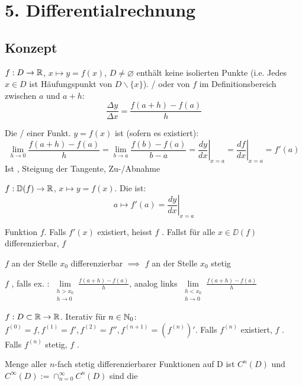 \section{5. Differentialrechnung}

\subsection{Konzept}

\Def $f: D \to \mathbb{R}$, $x \mapsto y = f(x)$, $D \neq \varnothing$ enthält keine
isolierten Punkte (i.e. Jedes $x \in D$ ist Häufungspunkt von $D \backslash \{x\}$).
/ oder 
von $f$ im Definitionsbereich zwischen $a$ und $a+h$:
$$\frac{\Delta y}{\Delta x} = \frac{f(a+h) - f(a)}{h}$$

\Def Die / einer Funkt. $y = f(x)$ 
ist (sofern es existiert):
$$\lim\limits_{h\to 0} \frac{f(a+h)-f(a)}{h} = \lim\limits_{b\to a}\frac{f(b) - f(a)}{b - a} = \left.\frac{dy}{dx}\right|_{x=a} = \left.\frac{df}{dx}\right|_{x=a} = f'(a)$$
Ist , Steigung der Tangente,  Zu-/Abnahme

\Def $f: \mathbb{D}(f) \to \mathbb{R}$, $x \mapsto y = f(x)$. Die  ist:
$$a \mapsto f'(a) = \left. \frac{dy}{dx} \right|_{x=a}$$

\Def Funktion $f$. Falls $f'(x)$ existiert, heisst $f$ .
Fallst für alle $x \in \DD(f)$ differenzierbar, $f$ 

\Satz $f$ an der Stelle $x_0$ differenzierbar $\implies$ $f$ an der Stelle $x_0$ stetig

\Def $f$ , falls ex. :
$\lim\limits_{\substack{h > x_0 \\ h \to 0}}\frac{f(a+h) - f(a)}{h}$, analog links
$\lim\limits_{\substack{h < x_0 \\ h \to 0}}\frac{f(a+h) - f(a)}{h}$

\Def $f: D \subset \mathbb{R} \to \mathbb{R}$. Iterativ  für $n \in \mathbb{N}_0$:
$f^{(0)} = f, f^{(1)} = f', f^{(2)} = f'', f^{(n+1)} = (f^{(n)})'$.
Falls $f^{(n)}$ existiert, $f$ . Falls $f^{(n)}$ stetig,
$f$ .

\Def Menge aller $n$-fach stetig differenzierbarer Funktionen auf D ist $C^n(D)$ und
$C^\infty(D) := \cap_{n=0}^\infty C^n(D)$ sind die 

